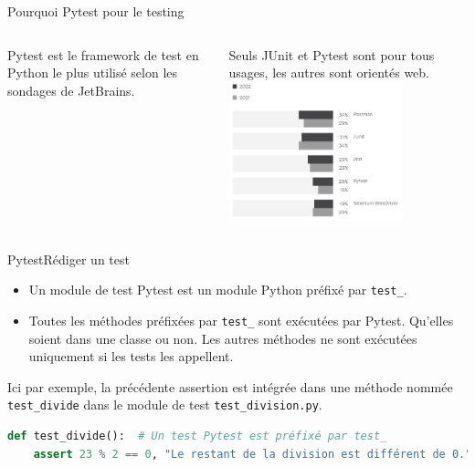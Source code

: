 \documentclass{beamer}
\begin{document}
    \begin{frame}{Pourquoi Pytest pour le testing}
        \transdissolve
        \begin{columns}
            Pytest est le framework de test en Python le plus utilisé selon les sondages de JetBrains\footnotemark.

            Seuls JUnit et Pytest sont pour tous usages, les autres sont orientés web.
            \centering
            \includegraphics[width=5cm]{image/jetbrains-survey-testing-framework}
        \end{columns}

    \end{frame}

    \begin{frame}[fragile]{Pytest}{Rédiger un test}
        \transdissolve
        \begin{itemize}
            \item Un module de test Pytest est un module Python préfixé par \lstinline{test_}.

            \item Toutes les méthodes préfixées par \lstinline{test_} sont exécutées par Pytest.
            Qu'elles soient dans une classe ou non.
            Les autres méthodes ne sont exécutées uniquement si les tests les appellent.
        \end{itemize}
        Ici par exemple, la précédente assertion est intégrée dans une méthode nommée \lstinline{test_divide} dans le module de test \lstinline{test_division.py}.
        \begin{lstlisting}[language=Python]
def test_divide():  # Un test Pytest est préfixé par test_
    assert 23 % 2 == 0, "Le restant de la division est différent de 0."
        \end{lstlisting}
    \end{frame}
\end{document}
